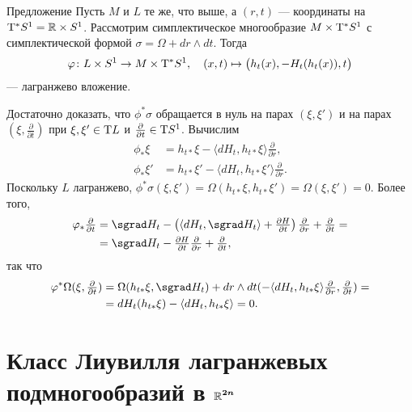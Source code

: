 \begin{thm*}{Предложение}
Пусть $M$ и $L$ те же, что выше, а $(r, t)$ — координаты на $\mathrm{T}^\ast S^1 = \mathbb{R} \times S^1$.
Рассмотрим симплектическое многообразие $M \times \mathrm{T}^\ast S^1$ с симплектической формой $\sigma = \Omega + dr \wedge dt$.
Тогда
\[\varphi\colon L \times S^1 \to M \times \mathrm{T}^\ast S^1,
\quad
(x, t) \mapsto \big(h_t (x), -H_{t} (h_t (x)), t\big)\]
— лагранжево вложение.
\end{thm*}

Достаточно доказать, что $\phi^\ast \sigma$ обращается в нуль на парах $(\xi, \xi')$ и на парах  $(\xi, \tfrac{\partial}{\partial t})$ при $\xi, \xi' \in \mathrm{T} L$ и $\tfrac{\partial}{\partial t} \in \mathrm{T} S^1$.
Вычислим 
\begin{align*}
\phi_\ast \xi
&= h_{t\ast} \xi - \langle dH_t, h_{t\ast} \xi\rangle
\tfrac{\partial}{\partial r},
\\
\phi_\ast \xi'
&= h_{t\ast} \xi' - \langle dH_t, h_{t\ast} \xi'\rangle
\tfrac{\partial}{\partial r}.
\end{align*}
Поскольку $L$ лагранжево, $\phi^\ast \sigma (\xi, \xi') = \Omega (h_{t\ast} \xi, h_{t\ast} \xi') = \Omega (\xi, \xi') = 0$.
Более того,
\begin{align*}
\phi_\ast\tfrac{\partial}{\partial t}
&= \sgrad H_t - 
\left( \langle dH_t, \sgrad H_t \rangle +\tfrac{\partial H}{\partial t}\right) \tfrac{\partial}{\partial r} +\tfrac{\partial}{\partial t}=
\\
&=\sgrad H_t - \tfrac{\partial H}{\partial t}\tfrac{\partial}{\partial r} +\tfrac{\partial}{\partial t},
\end{align*}
так что
\begin{align*}
\phi^\ast \Omega (\xi, \tfrac{\partial}{\partial t})
&= \Omega (h_{t\ast} \xi, \sgrad H_t) + dr \wedge dt (-\langle dH_t, h_{t\ast} \xi\rangle \tfrac{\partial}{\partial r},\tfrac{\partial}{\partial t}) =
\\
&=dH_t (h_{t\ast} \xi) - \langle dH_t, h_{t\ast} \xi\rangle = 0.
\end{align*}
\qedsf

\section[Класс Лиувилля]{Класс Лиувилля лагранжевых\\подмногообразий в $\bm{\mathbb{R}^{2n}}$}


